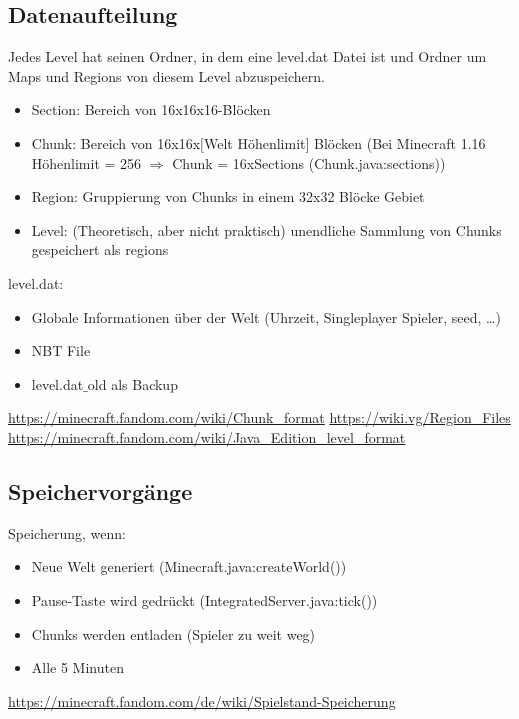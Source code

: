 \subsection{Datenaufteilung} \label{ssec:datenaufteilung}
Jedes Level hat seinen Ordner, in dem eine level.dat Datei ist und Ordner um Maps und Regions von diesem Level abzuspeichern. 

\begin{itemize}
    \item Section: Bereich von 16x16x16-Blöcken
    \item Chunk: Bereich von 16x16x$[$Welt Höhenlimit$]$ Blöcken (Bei Minecraft 1.16 Höhenlimit = 256 $\Rightarrow{}$ Chunk = 16xSections (Chunk.java:sections))
    \item Region: Gruppierung von Chunks in einem 32x32 Blöcke Gebiet
    \item Level: (Theoretisch, aber nicht praktisch) unendliche Sammlung von Chunks gespeichert als regions
\end{itemize}

level.dat:
\begin{itemize}
    \item Globale Informationen über der Welt (Uhrzeit, Singleplayer Spieler, seed, \dots)
    \item NBT File
    \item level.dat$\_$old als Backup
\end{itemize}

\url{https://minecraft.fandom.com/wiki/Chunk_format}
\url{https://wiki.vg/Region_Files}
\url{https://minecraft.fandom.com/wiki/Java_Edition_level_format}

\subsection{Speichervorgänge}

Speicherung, wenn:
\begin{itemize}
    \item Neue Welt generiert (Minecraft.java:createWorld())
    \item Pause-Taste wird gedrückt (IntegratedServer.java:tick())
    \item Chunks werden entladen (Spieler zu weit weg)
    \item Alle 5 Minuten
\end{itemize}

\url{https://minecraft.fandom.com/de/wiki/Spielstand-Speicherung}

